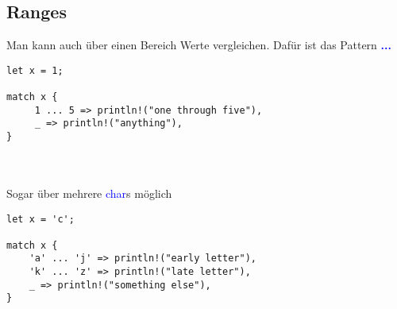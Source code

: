 \subsection{Ranges}
Man kann auch über einen Bereich Werte vergleichen. Dafür ist das Pattern \textbf{\textcolor{blue}{...}}

\begin{lstlisting}
let x = 1;

match x {
     1 ... 5 => println!("one through five"),
     _ => println!("anything"),
}
\end{lstlisting}
\hrulefill\\\\
Sogar über mehrere \textcolor{blue}{char}s möglich
\begin{lstlisting}
let x = 'c';

match x {
    'a' ... 'j' => println!("early letter"),
    'k' ... 'z' => println!("late letter"),
    _ => println!("something else"),
}
\end{lstlisting}